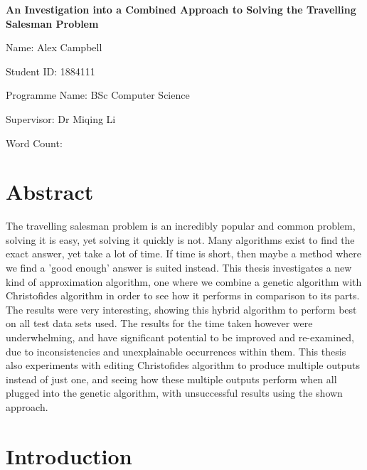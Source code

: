 \documentclass[11pt,a4paper,titlepage]{article}
\author{Alex Campbell}
\date{}
\begin{document}
\begin{titlepage}
	\begin{center}
	\vspace*{1cm}
	
	\textbf{An Investigation into a Combined Approach to Solving the Travelling Salesman Problem}
	
	\vspace{1.5cm}

	Name: Alex Campbell
	
	Student ID: 1884111
	
	Programme Name: BSc Computer Science
	
	\vspace{1cm}	
	
	Supervisor: Dr Miqing Li
	
	\vspace{1cm}	
	
	Word Count: 
	
	\end{center}
\end{titlepage}
\setlength{\parindent}{0em}
\setlength{\parskip}{1em}


\section*{Abstract}

The travelling salesman problem is an incredibly popular and common problem, solving it is easy, yet solving it quickly is not. Many algorithms exist to find the exact answer, yet take a lot of time. If time is short, then maybe a method where we find a 'good enough' answer is suited instead. This thesis investigates a new kind of approximation algorithm, one where we combine a genetic algorithm with Christofides algorithm in order to see how it performs in comparison to its parts. The results were very interesting, showing this hybrid algorithm to perform best on all test data sets used. The results for the time taken however were underwhelming, and have significant potential to be improved and re-examined, due to inconsistencies and unexplainable occurrences within them. This thesis also experiments with editing Christofides algorithm to produce multiple outputs instead of just one, and seeing how these multiple outputs perform when all plugged into the genetic algorithm, with unsuccessful results using the shown approach.

\pagebreak
\tableofcontents
\pagebreak

\section{Introduction}
\end{document}
